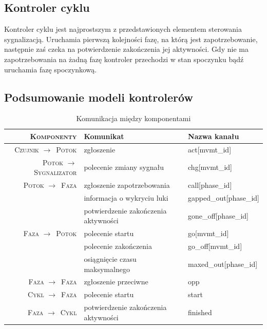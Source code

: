 \documentclass{pracamgr}
\newcommand{\rarr}{$\rightarrow$}
\theoremstyle{plain}
\begin{document}
\subsection{Kontroler cyklu}
Kontroler cyklu jest najprostszym z przedstawionych elementem
sterowania sygnalizacją. Uruchamia pierwszą kolejności fazę,
na którą jest zapotrzebowanie, następnie zaś czeka na potwierdzenie
zakończenia jej aktywności. Gdy nie ma zapotrzebowania na żadną fazę
kontroler przechodzi w stan spoczynku bądź uruchamia fazę spoczynkową.

\subsection{Podsumowanie modeli kontrolerów}

\renewcommand{\arraystretch}{1.4}
\begin{table}
  \centering
  \begin{tabular}{>{\scshape}r|p{}|>{\ttfamily}p{}}
    \firsthline\firsthline
    \textbf{Komponenty} & \textbf{Komunikat} & \textnormal{\bfseries Nazwa kanału} \\ \hline
    Czujnik \rarr\ Potok & zgłoszenie & act[mvmt\_id] \\ \hline
    Potok \rarr\ Sygnalizator & polecenie zmiany sygnału & chg[mvmt\_id]
    \\ \hline
    Potok \rarr\ Faza & zgłoszenie zapotrzebowania & call[phase\_id] \\
                      & informacja o wykryciu luki & gapped\_out[phase\_id] \\
                      & potwierdzenie zakończenia aktywności & gone\_off[phase\_id]
    \\ \hline
    Faza \rarr\ Potok & polecenie startu & go[mvmt\_id] \\
                      & polecenie zakończenia & go\_off[mvmt\_id] \\
                      & osiągnięcie czasu maksymalnego & maxed\_out[phase\_id]
    \\ \hline
    Faza \rarr\ Faza & zgłoszenie przeciwne & opp
    \\ \hline
    Cykl \rarr\ Faza & polecenie startu & start \\ \hline
    Faza \rarr\ Cykl & potwierdzenie zakończenia aktywności & finished \\
    \hline\hline
  \end{tabular}
  \caption{Komunikacja między komponentami}
  \label{tab:models-comm}
\end{table}
\end{document}

